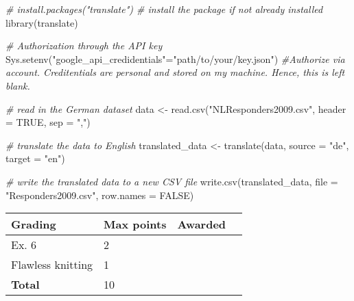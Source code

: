 \documentclass[
]{article}
\newenvironment{Shaded}{\begin{snugshade}}{\end{snugshade}}
\newcommand{\AttributeTok}[1]{\textcolor[rgb]{0.77,0.63,0.00}{#1}}
\newcommand{\CommentTok}[1]{\textcolor[rgb]{0.56,0.35,0.01}{\textit{#1}}}
\newcommand{\ConstantTok}[1]{\textcolor[rgb]{0.00,0.00,0.00}{#1}}
\newcommand{\FunctionTok}[1]{\textcolor[rgb]{0.00,0.00,0.00}{#1}}
\newcommand{\NormalTok}[1]{#1}
\newcommand{\OtherTok}[1]{\textcolor[rgb]{0.56,0.35,0.01}{#1}}
\newcommand{\StringTok}[1]{\textcolor[rgb]{0.31,0.60,0.02}{#1}}
\begin{document}
\begin{Shaded}
\begin{Highlighting}[]
\CommentTok{\# install.packages("translate") \# install the package if not already installed}
\FunctionTok{library}\NormalTok{(translate)}

\CommentTok{\# Authorization through the API key}
\FunctionTok{Sys.setenv}\NormalTok{(}\StringTok{"google\_api\_credidentials"}\OtherTok{=}\StringTok{"path/to/your/key.json"}\NormalTok{) }\CommentTok{\#Authorize via account. Creditentials are personal and stored on my machine. Hence, this is left blank.}

\CommentTok{\# read in the German dataset}
\NormalTok{data }\OtherTok{\textless{}{-}} \FunctionTok{read.csv}\NormalTok{(}\StringTok{"NLResponders2009.csv"}\NormalTok{, }\AttributeTok{header =} \ConstantTok{TRUE}\NormalTok{, }\AttributeTok{sep =} \StringTok{","}\NormalTok{)}

\CommentTok{\# translate the data to English}
\NormalTok{translated\_data }\OtherTok{\textless{}{-}} \FunctionTok{translate}\NormalTok{(data, }\AttributeTok{source =} \StringTok{"de"}\NormalTok{, }\AttributeTok{target =} \StringTok{"en"}\NormalTok{)}

\CommentTok{\# write the translated data to a new CSV file}
\FunctionTok{write.csv}\NormalTok{(translated\_data, }\AttributeTok{file =} \StringTok{"Responders2009.csv"}\NormalTok{, }\AttributeTok{row.names =} \ConstantTok{FALSE}\NormalTok{)}
\end{Highlighting}
\end{Shaded}

\begin{longtable}[]{@{}llll@{}}
\toprule()
Grading & Max points & Awarded & \\
\midrule()
\endhead
Ex. 6 & 2 & & \\
Flawless knitting & 1 & & \\
\textbf{Total} & 10 & & \\
\bottomrule()
\end{longtable}
\end{document}
